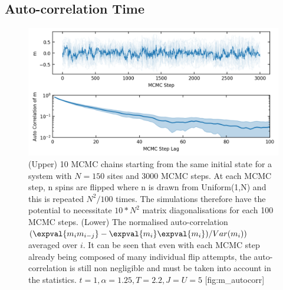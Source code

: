 \hypertarget{auto-correlation-time-1}{%
\subsection{Auto-correlation Time}\label{auto-correlation-time-1}}

\begin{figure}
\hypertarget{fig:m_autocorr}{%
\centering
\includegraphics{figs/lsr/m_autocorr.png}
\caption{(Upper) 10 MCMC chains starting from the same initial state for a system with \(N = 150\) sites and 3000 MCMC steps. At each MCMC step, n spins are flipped where n is drawn from Uniform(1,N) and this is repeated \(N^2/100\) times. The simulations therefore have the potential to necessitate \(10*N^2\) matrix diagonalisations for each 100 MCMC steps. (Lower) The normalised auto-correlation \((\expval{m_i m_{i-j}} - \expval{m_i}\expval{m_i}) / Var(m_i))\) averaged over \(i\). It can be seen that even with each MCMC step already being composed of many individual flip attempts, the auto-correlation is still non negligible and must be taken into account in the statistics. \(t = 1, \alpha = 1.25, T = 2.2, J = U = 5\) \protect\hypertarget{fig:m_autocorr}{}{{[}fig:m\_autocorr{]}}}\label{fig:m_autocorr}
}
\end{figure}

